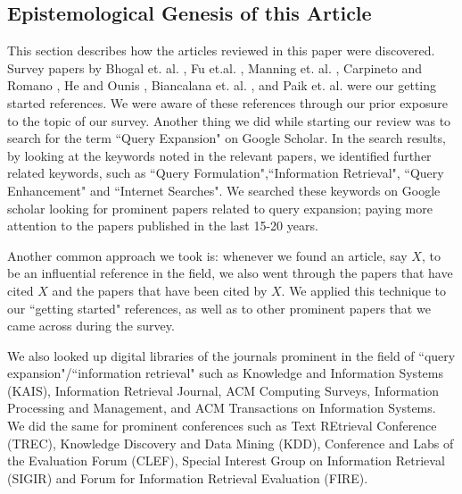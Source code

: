 \subsection{Epistemological Genesis of this Article}
This section describes how the articles reviewed in this paper were discovered. Survey papers by Bhogal et. al. \cite{bhogal2007review}, Fu et.al. \cite{fu2005ontology}, Manning et. al. \cite{Manning:2008:IIR:1394399}, Carpineto and Romano \cite{carpineto2012survey}, He and Ounis \cite{he2007combining}, Biancalana et. al. \cite{biancalana2013social}, and Paik et. al. \cite{paik2014incremental} were our getting started references. We were aware of these references through our prior exposure to the topic of our survey. Another thing we did while starting our review was to search for the term ``Query Expansion" on Google Scholar. In the search results, by looking at the keywords noted in the relevant papers, we identified further related keywords, such as ``Query Formulation",``Information Retrieval", ``Query Enhancement" and ``Internet Searches".  We searched these keywords on Google scholar looking for prominent papers related to query expansion; paying more attention to the papers published in the last 15-20 years. 

Another common approach we took is: whenever we found an article, say $X$, to be an influential reference in the field, we also went through the papers that have cited $X$ and the papers that have been cited by $X$. We applied this technique to our ``getting started" references, as well as to other prominent papers that we came across during the survey.

We also looked up digital libraries of the journals prominent in the field of ``query expansion"/``information retrieval" such as Knowledge and Information Systems (KAIS), Information Retrieval Journal, ACM Computing Surveys, Information Processing and Management, and  ACM Transactions on Information Systems. We did the same  for prominent conferences such as Text REtrieval Conference (TREC), Knowledge Discovery and Data Mining (KDD), Conference and Labs of the Evaluation Forum (CLEF), Special Interest Group on Information Retrieval (SIGIR) and Forum for Information Retrieval Evaluation (FIRE). 

